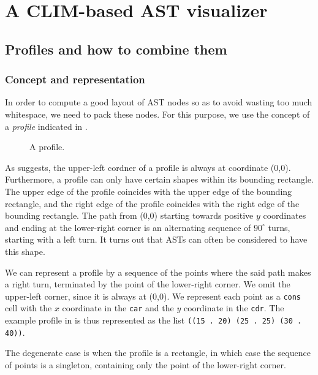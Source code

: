 \section{A CLIM-based AST visualizer}

\subsection{Profiles and how to combine them}

\subsubsection{Concept and representation}

In order to compute a good layout of AST nodes so as to avoid wasting
too much whitespace, we need to pack these nodes.  For this purpose,
we use the concept of a \emph{profile} indicated in
.

\begin{figure}
\begin{center}
\end{center}
\caption{\label{fig-profile}
A profile.}
\end{figure}

As  suggests, the upper-left cordner of a profile
is always at coordinate (0,0).  Furthermore, a profile can only have
certain shapes within its bounding rectangle.  The upper edge of the
profile coincides with the upper edge of the bounding rectangle, and
the right edge of the profile coincides with the right edge of the
bounding rectangle.  The path from (0,0) starting towards positive $y$
coordinates and ending at the lower-right corner is an alternating
sequence of $90^\circ$ turns, starting with a left turn.  It turns out
that ASTs can often be considered to have this shape.

We can represent a profile by a sequence of the points where the said
path makes a right turn, terminated by the point of the lower-right
corner.  We omit the upper-left corner, since it is always at (0,0).
We represent each point as a \texttt{cons} cell with the $x$
coordinate in the \texttt{car} and the $y$ coordinate in the
\texttt{cdr}.  The example profile in  is thus
represented as the list \texttt{((15 . 20) (25 . 25) (30 . 40))}.

The degenerate case is when the profile is a rectangle, in which case
the sequence of points is a singleton, containing only the point of
the lower-right corner.

